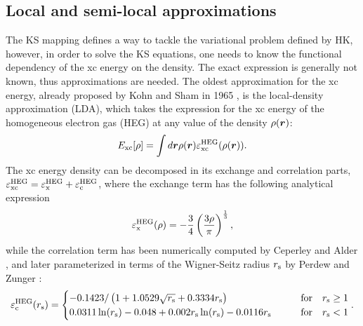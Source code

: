 \subsection{Local and semi-local approximations\label{sec:dft-approx}}
The KS mapping defines a way to tackle the variational problem defined by HK, however, in order to solve the KS equations, one needs to know the functional dependency of the xc energy on the density. The exact expression is generally not known, thus approximations are needed. The oldest approximation for the xc energy, already proposed by Kohn and Sham in 1965 \cite{kohn_self-consistent_1965}, is the local-density approximation (LDA), which takes the expression for the xc energy of the homogeneous electron gas (HEG) at any value of the density $\rho({\bm r})$:
%
\begin{equation}
    E_{\rm xc}[\rho] = \int d{\bm r} \rho({\bm r}) \varepsilon^{\rm HEG}_{\rm xc}(\rho({\bm r})) .
    \label{eq:lda-xc}
\end{equation}
%
The xc energy density can be decomposed in its exchange and correlation parts, $\varepsilon^{\rm HEG}_{\rm xc} = \varepsilon^{\rm HEG}_{\rm x} + \varepsilon^{\rm HEG}_{\rm c}$, where the exchange term has the following analytical expression
%
\begin{equation}
    \varepsilon^{\rm HEG}_{\rm x}(\rho) = - \frac{3}{4} \left( \frac{3\rho}{\pi} \right)^{\frac{1}{3}} ,
    \label{eq:lda-ex}
\end{equation}
%
while the correlation term has been numerically computed by Ceperley and Alder \cite{ceperley_ground_1980}, and later parameterized in terms of the Wigner-Seitz radius $r_{\rm s}$ by Perdew and Zunger \cite{perdew_self-interaction_1981}:
%
\begin{equation}
    \varepsilon^{\rm HEG}_{\rm c}(r_{\rm s}) =
    \begin{cases}
        -0.1423 / \left( 1 + 1.0529\sqrt{r_{\rm s}} + 0.3334 r_{\rm s} \right) & \text{for} \quad r_{\rm s} \geq 1 \\
        0.0311 \ln(r_{\rm s}) - 0.048 + 0.002 r_{\rm s} \ln(r_{\rm s}) - 0.0116 r_{\rm s} \qquad & \text{for} \quad r_{\rm s} < 1
    \end{cases} .
    \label{eq:lda-corr}
\end{equation}

